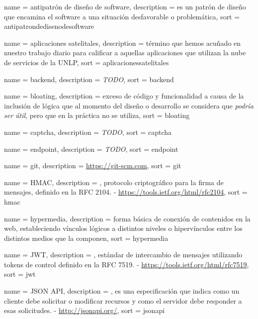 \newpage
{} {
  name = {antipatrón de diseño de software},
  description = {es un patrón de diseño que encamina el software a una situación desfavorable o problemática},
  sort = {antipatrondedisenodesoftware}
}

 {
  name = {aplicaciones satelitales},
  description = {término que hemos acuñado en nuestro trabajo diario para calificar a aquellas aplicaciones que utilizan la nube de servicios de la UNLP},
  sort = {aplicacionessatelitales}
}

 {
  name = {backend},
  description = {\textit{TODO}},
  sort = {backend}
}

 {
  name = {bloating},
  description = {exceso de código y funcionalidad a causa de la inclusión de lógica que al momento del diseño o desarrollo se considera que \textit{podría ser útil}, pero que en la práctica no se utiliza},
  sort = {bloating}
}

 {
  name = {captcha},
  description = {\textit{TODO}},
  sort = {captcha}
}

 {
  name = {endpoint},
  description = {\textit{TODO}},
  sort = {endpoint}
}

 {
  name = {git},
  description = {\url{https://git-scm.com}},
  sort = {git}
}

 {
  name = {HMAC},
  description = {, protocolo criptográfico para la firma de mensajes, definido en la RFC 2104. - \url{https://tools.ietf.org/html/rfc2104}},
  sort = {hmac}
}

 {
  name = {hypermedia},
  description = {forma básica de conexión de contenidos en la web, estableciendo vínculos lógicos a distintos niveles o hipervínculos entre los distintos medios que la componen},
  sort = {hypermedia}
}

 {
  name = {JWT},
  description = {, estándar de intercambio de mensajes utilizando tokens de control definido en la RFC 7519. - \url{https://tools.ietf.org/html/rfc7519}},
  sort = {jwt}
}

 {
  name = {JSON API},
  description = {, es una especificación que indica como un cliente debe solicitar o modificar recursos y como el servidor debe responder a esas solicitudes. - \url{http://jsonapi.org/}},
  sort = {jsonapi}
}

